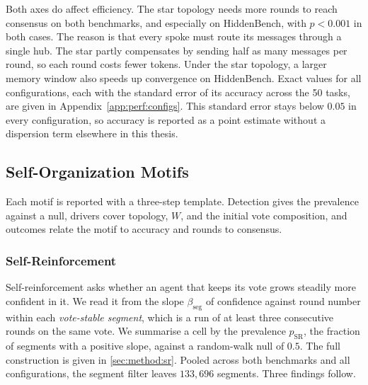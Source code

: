 Both axes do affect efficiency. The star topology needs more rounds to reach
consensus on both benchmarks, and especially on HiddenBench, with $p < 0.001$ in
both cases. The reason is that every spoke must route its messages through a single
hub. The star partly compensates by sending half as many messages per round, so each
round costs fewer tokens. Under the star topology, a larger memory window also speeds
up convergence on HiddenBench. Exact values for all configurations, each with the
standard error of its accuracy across the 50 tasks, are given in
Appendix~\ref{app:perf:configs}. This standard error stays below $0.05$ in every
configuration, so accuracy is reported as a point estimate without a dispersion
term elsewhere in this thesis.

\subsection{Self-Organization Motifs}
\label{sec:results:motifs}

Each motif is reported with a three-step template. Detection gives the prevalence
against a null, drivers cover topology, $W$, and the initial vote composition, and
outcomes relate the motif to accuracy and rounds to consensus.

\subsubsection{Self-Reinforcement}
\label{sec:results:sr}

Self-reinforcement asks whether an agent that keeps its vote grows steadily more
confident in it. We read it from the slope $\beta_{\mathrm{seg}}$ of confidence
against round number within each \emph{vote-stable segment}, which is a run of at
least three consecutive rounds on the same vote. We summarise a cell by the prevalence
$p_{\mathrm{SR}}$, the fraction of segments with a positive slope, against a
random-walk null of $0.5$. The full construction is given in \autoref{sec:method:sr}.
Pooled across both benchmarks and all configurations, the segment filter leaves
$133{,}696$ segments. Three findings follow.

